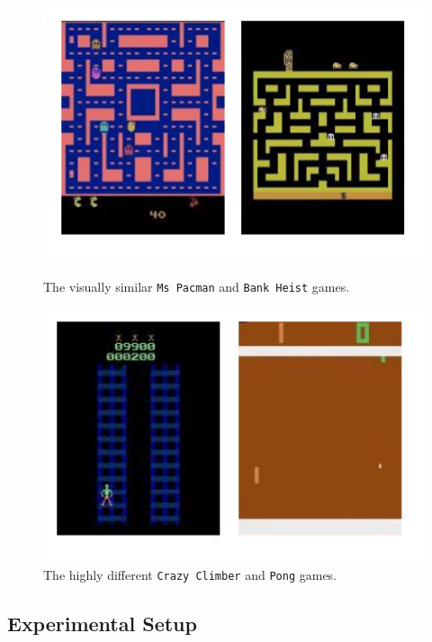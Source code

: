 \begin{figure}[ht]
\centering
\begin{minipage}[b]{0.45\linewidth}
\centering
\includegraphics[width=\textwidth]{./Images/Chapter08/similar_sources}
\caption{The visually similar \texttt{Ms Pacman} and \texttt{Bank Heist} games.}
\label{fig:similar_games}
\end{minipage}
\hspace{0.5cm}
\begin{minipage}[b]{0.45\linewidth}
\centering
\includegraphics[width=\textwidth]{./Images/Chapter08/dissimilar_sources}
\caption{The highly different \texttt{Crazy Climber} and \texttt{Pong} games.}
\label{fig:dissimilar_games}
\end{minipage}
\end{figure}


\subsection{Experimental Setup}

